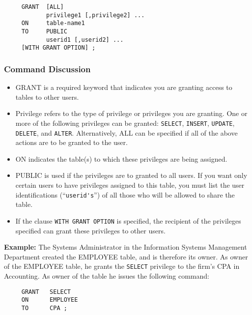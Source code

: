 \begin{verbatim}
     GRANT  [ALL]
            privilege1 [,privilege2] ...
     ON     table-name1
     TO     PUBLIC
            userid1 [,userid2] ...
     [WITH GRANT OPTION] ;
\end{verbatim}

\subsubsection{Command Discussion}

\begin{itemize}
\item GRANT is a required keyword that indicates you are granting
access to tables
to other users.

\item Privilege refers to the type of privilege or privileges you are
granting.  One or more of the following privileges can be granted:
\verb`SELECT`, \verb`INSERT`, \verb`UPDATE`, \verb`DELETE`, and \verb`ALTER`.  Alternatively, ALL can be
specified if all of the above actions are to be granted to the user.

\item ON indicates the table(s)
to which these privileges
are being assigned.

\item PUBLIC is used if the privileges are to granted to all users.
If you want only certain users to have privileges assigned to this
table, you must list the user identifications (``\verb`userid's`'') of
all those who will be allowed to share the table.

\item If the clause {\tt WITH GRANT OPTION} is specified, the recipient of
the privileges specified can grant these privileges to other users.
\end{itemize}

{\bf Example:}
The Systems Administrator in the Information Systems Management
Department created the EMPLOYEE table, and is therefore its owner.  As
owner of the EMPLOYEE table, he grants the \verb`SELECT` privilege to the
firm's CPA in Accounting.  As owner of the table he issues the
following command:

\begin{verbatim}
     GRANT   SELECT
     ON      EMPLOYEE
     TO      CPA ;
\end{verbatim}

